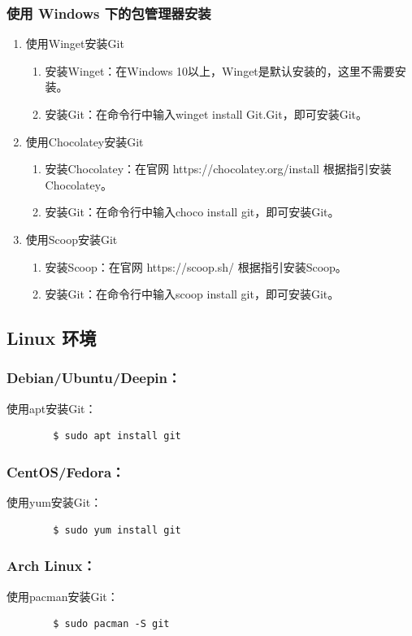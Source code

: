 \documentclass[UTF8]{ctexart}
\begin{document}
\subsubsection{使用 Windows 下的包管理器安装}
\begin{enumerate}
    \item 使用Winget安装Git
          \begin{enumerate}
              \item 安装Winget：在Windows 10以上，Winget是默认安装的，这里不需要安装。
              \item 安装Git：在命令行中输入winget install Git.Git，即可安装Git。
          \end{enumerate}
    \item 使用Chocolatey安装Git
          \begin{enumerate}
              \item 安装Chocolatey：在官网 https://chocolatey.org/install 根据指引安装Chocolatey。
              \item 安装Git：在命令行中输入choco install git，即可安装Git。
          \end{enumerate}
    \item 使用Scoop安装Git
          \begin{enumerate}
              \item 安装Scoop：在官网 https://scoop.sh/ 根据指引安装Scoop。
              \item 安装Git：在命令行中输入scoop install git，即可安装Git。
          \end{enumerate}
\end{enumerate}
\subsection{Linux 环境}


\subsubsection{Debian/Ubuntu/Deepin：}使用apt安装Git：
\begin{verbatim}
        $ sudo apt install git
\end{verbatim}
\subsubsection{CentOS/Fedora：}使用yum安装Git：
\begin{verbatim}
        $ sudo yum install git
\end{verbatim}
\subsubsection{Arch Linux：}使用pacman安装Git：
\begin{verbatim}
        $ sudo pacman -S git
\end{verbatim}
\end{document}
